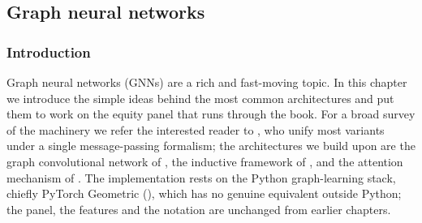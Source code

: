 \subsection{Graph neural networks}

% 
% 
%

\subsubsection{Introduction}\label{sec_gnn_intro}

Graph neural networks (GNNs) are a rich and fast-moving topic. In this chapter we introduce the simple ideas behind the most common architectures and put them to work on the equity panel that runs through the book. For a broad survey of the machinery we refer the interested reader to \cite{gilmer2017neural}, who unify most variants under a single message-passing formalism; the architectures we build upon are the graph convolutional network of \cite{kipf2017semisupervised}, the inductive framework of \cite{hamilton2017inductive}, and the attention mechanism of \cite{velickovic2018graph}. The implementation rests on the Python graph-learning stack, chiefly PyTorch Geometric (\cite{fey2019fast}), which has no genuine equivalent outside Python; the panel, the features and the notation are unchanged from earlier chapters.

